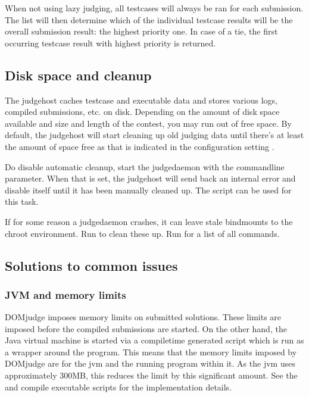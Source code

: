 \documentclass[a4paper,10pt,english,openany]{sphinxmanual}
\begin{document}
\sphinxAtStartPar
When not using lazy judging, all testcases will always be ran for each
submission. The  list will then determine which of the
individual testcase results will be the overall submission result:
the highest priority one. In case of a tie, the first occurring testcase
result with highest priority is returned.


\subsection{Disk space and cleanup}
\label{\detokenize{judging:disk-space-and-cleanup}}
\sphinxAtStartPar
The judgehost caches testcase and executable data and stores various
logs, compiled submissions, etc. on disk. Depending on the amount of
disk space available and size and length of the contest, you may run
out of free space. By default, the judgehost will start cleaning up
old judging data until there’s at least the amount of space free as
that is indicated in the configuration setting .

\sphinxAtStartPar
Do disable automatic cleanup, start the judgedaemon with the
 commandline parameter. When that is set, the
judgehost will send back an internal error and disable itself until
it has been manually cleaned up. The script 
can be used for this task.

\sphinxAtStartPar
If for some reason a judgedaemon crashes, it can leave stale
bind\sphinxhyphen{}mounts to the chroot environment. Run
 to clean these up. Run
 for a list of all
commands.


\subsection{Solutions to common issues}
\label{\detokenize{judging:solutions-to-common-issues}}

\subsubsection{JVM and memory limits}
\label{\detokenize{judging:jvm-and-memory-limits}}
\sphinxAtStartPar
DOMjudge imposes memory limits on submitted solutions. These limits
are imposed before the compiled submissions are started. On the other
hand, the Java virtual machine is started via a compile\sphinxhyphen{}time generated
script which is run as a wrapper around the program. This means that
the memory limits imposed by DOMjudge are for the jvm and the running
program within it. As the jvm uses approximately 300MB, this reduces
the limit by this significant amount. See the  and
 compile executable scripts for the
implementation details.
\end{document}
